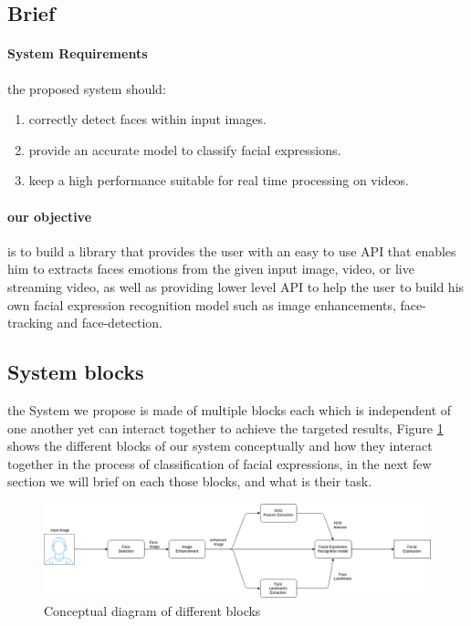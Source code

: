 \subsection{Brief}
\paragraph{System Requirements}
the proposed system should:
\begin{enumerate}
	\item correctly detect faces within input images.
	\item provide an accurate model to classify facial expressions.
	\item keep a high performance suitable for real time processing on videos.
\end{enumerate}
\paragraph{our objective} is to build a library that provides the user with an easy to use API that enables him to extracts faces emotions from the given input image, video, or live streaming video, as well as providing lower level API to help the user to build his own facial expression recognition model such as image enhancements, face-tracking and face-detection.
\subsection{System blocks}
the System we propose is made of multiple blocks each which is independent of one another yet can interact together to achieve the targeted results, Figure 
\ref{fig:facial_expression_recognition} shows the different blocks of our system conceptually and how they interact together in the process of classification of facial expressions, in the next few section we will brief on each those blocks, and what is their task. 

\begin{figure}
	\centering
	\includegraphics[width=\textwidth]{images/facial_expression_detection.png}
	\caption{Conceptual diagram of different blocks}
	\label{fig:facial_expression_recognition}
\end{figure}

